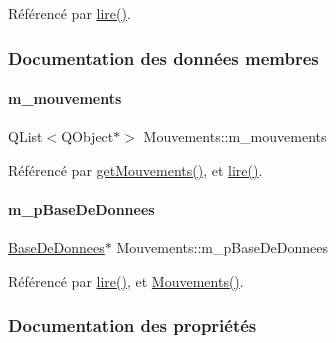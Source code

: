 Référencé par \hyperlink{class_mouvements_a1d8306c0672efe509e71d2bdbd60208b}{lire()}.



\subsubsection{Documentation des données membres}
\mbox{\label{class_mouvements_a5de7bbf3118ba8257e270011f2edf152}} 
\paragraph{\texorpdfstring{m\+\_\+mouvements}{m\_mouvements}}
{\footnotesize\ttfamily Q\+List$<$Q\+Object$\ast$$>$ Mouvements\+::m\+\_\+mouvements\hspace{0.3cm}{\ttfamily [private]}}



Référencé par \hyperlink{class_mouvements_a3ab449208a00af567cc5f638d12b98ef}{get\+Mouvements()}, et \hyperlink{class_mouvements_a1d8306c0672efe509e71d2bdbd60208b}{lire()}.

\mbox{\label{class_mouvements_a8cb8047917f2e94adf9798c40b618d31}} 
\paragraph{\texorpdfstring{m\+\_\+p\+Base\+De\+Donnees}{m\_pBaseDeDonnees}}
{\footnotesize\ttfamily \hyperlink{class_base_de_donnees}{Base\+De\+Donnees}$\ast$ Mouvements\+::m\+\_\+p\+Base\+De\+Donnees\hspace{0.3cm}{\ttfamily [private]}}



Référencé par \hyperlink{class_mouvements_a1d8306c0672efe509e71d2bdbd60208b}{lire()}, et \hyperlink{class_mouvements_a42a511c836761016e503d66850da0b35}{Mouvements()}.



\subsubsection{Documentation des propriétés}
\mbox{\label{class_mouvements_a8f00148228ead33e98cc8e3a6ad9e806}} 
